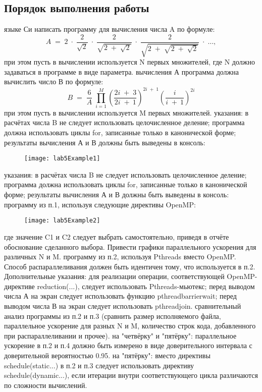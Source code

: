 { %
	\subsection{Порядок выполнения работы}
	\begin{enumerate}
		 языке Си написать программу для вычисления числа A по формуле:
			$$A\;=\;2\;\cdot\;\frac2{\sqrt2}\;\cdot\;\frac2{\sqrt{2\;+\;\sqrt2}}\;\cdot\;\frac2{\sqrt{2\;+\;\sqrt{2\;+\;\sqrt2}}}\;\cdot\;\dots,$$
			 при этом пусть в вычислении используется N первых множителей, где N должно задаваться в программе в виде параметра.
		 вычисления А программа должна вычислить число В по формуле: 
			$$B\;=\;\frac6A\;{\textstyle\prod_ {i=1}^M}\left(\frac{2i\;+\;3}{2i\;+\:1}\right)^{2i\;+\;1}\left(\frac i{i\;+\:1}\right)^{2i}$$
			при этом пусть в вычислении используется M первых множителей.
			 указания: в расчётах числа B не следует использовать целочисленное деление; программа должна использовать циклы for, записанные только в канонической форме; результаты вычисления А и В должны быть выведены в консоль:
			\begin{figure}[H]
				\texttt{[image: lab5Example1]}
			\end{figure}
			 указания: в расчётах числа B не следует использовать целочисленное деление; программа должна использовать циклы for, записанные только в канонической форме; результаты вычисления А и В должны быть выведены в консоль:
		 программу из п.1, используя следующие директивы OpenMP:
			\begin{figure}[H]
				\texttt{[image: lab5Example2]}
			\end{figure}
			где значение C1 и C2 следует выбрать самостоятельно, приведя в отчёте обоснование сделанного выбора. Привести графики параллельного ускорения для различных N и M.
		 программу из п.2, используя Pthreads вместо OpenMP. Способ распараллеливания должен быть идентичен тому, что используется  в п.2. Дополнительные указания: для реализации операции, соответствующей OpenMP-директиве reduction(...), следует использовать Pthreads-мьютекс; перед выводом числа А на экран следует использовать функцию pthread\textunderscore barrier\textunderscore wait; перед выводом числа В на экран следует использовать pthread\textunderscore join.
		 сравнительный анализ программы из п.2 и п.3 (сравнить размер исполняемого файла, параллельное ускорение для разных N и M, количество строк кода, добавленного при распараллеливании и прочее).
		 на "четвёрку" и "пятёрку": параллельное ускорение в п.2 и п.4  должно быть измерено в виде доверительного интервала с доверительной вероятностью 0.95.
		 на "пятёрку": вместо директивы schedule(static...) в п.2 и п.3 следует использовать директиву schedule(dynamic...), если итерации внутри соответствующего цикла различаются по сложности вычислений.
	\end{enumerate}
}